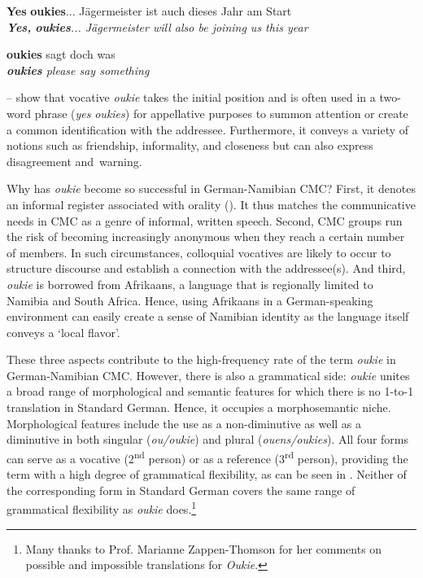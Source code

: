 \documentclass[output=paper]{langsci/langscibook}
\begin{document}
 
\ea
\label{ex:radke:16}
 \textbf{Yes} \textbf{oukies}... Jägermeister ist auch dieses Jahr am Start\\
 \textit{\textbf{{Yes,}} \textbf{{oukies}}... Jägermeister will also be joining us this year}
 \z
 
\ea\label{ex:radke:17}
 \textbf{oukies} sagt doch was\\
 \textit{\textbf{{oukies}} {please say something}}
 \z
 
-- show that vocative \textit{oukie} takes the initial position and is often used in a two-word phrase (\textit{yes} \textit{oukies}) for appellative purposes to summon attention or create a common identification with the addressee. Furthermore, it conveys a variety of notions such as friendship, informality, and closeness but can also express disagreement and~warning. 

Why has \textit{oukie} become so successful in German-Namibian CMC? First, it denotes an informal register associated with orality (\citealt[3]{wiese_registerdifferenzierung_2021}). It thus matches the communicative needs in CMC as a genre of informal, written speech. Second, CMC groups run the risk of becoming increasingly anonymous when they reach a certain number of members. In such circumstances, colloquial vocatives are likely to occur to structure discourse and establish a connection with the addressee(s). And third, \textit{oukie} is borrowed from Afrikaans, a language that is regionally limited to Namibia and South Africa. Hence, using Afrikaans in a German-speaking environment can easily create a sense of Namibian identity as the language itself conveys a ‘local flavor’. 

These three aspects contribute to the high-frequency rate of the term \textit{oukie} in German-Namibian CMC. However, there is also a grammatical side: \textit{oukie} unites a broad range of morphological and semantic features for which there is no 1-to-1 translation in Standard German. Hence, it occupies a morphosemantic niche. Morphological features include the use as a non-diminutive as well as a diminutive in both singular (\textit{ou/oukie}) and plural (\textit{ouens/oukies}). All four forms can serve as a vocative (2\textsuperscript{nd} person) or as a reference (3\textsuperscript{rd} person), providing the term with a high degree of grammatical flexibility, as can be seen in . Neither of the corresponding form in Standard German covers the same range of grammatical flexibility as \textit{oukie} does.\footnote{Many thanks to Prof. Marianne Zappen-Thomson for her comments on possible and impossible translations for \textit{Oukie}.} 
\end{document}
